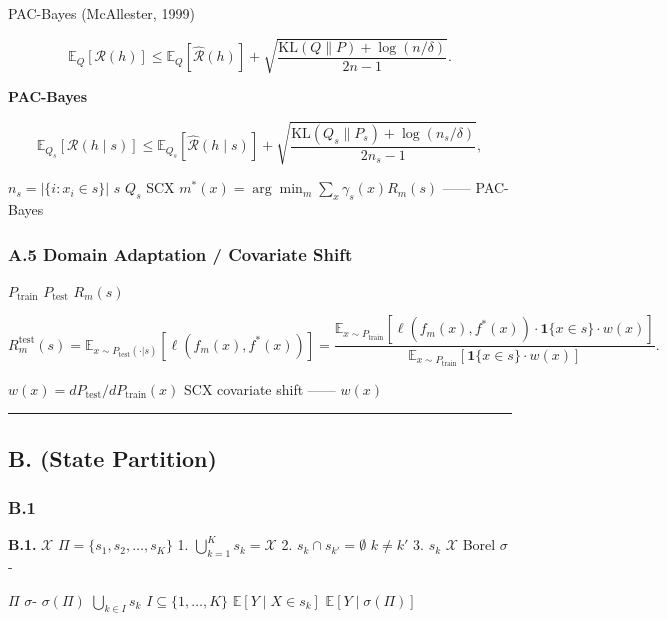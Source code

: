 \documentclass[
  12pt,
]{article}
\begin{document}
PAC-Bayes  (McAllester, 1999)


\[\mathbb{E}_{Q}[\mathcal{R}(h)] \leq \mathbb{E}_{Q}[\hat{\mathcal{R}}(h)] + \sqrt{\frac{\text{KL}(Q \| P) + \log(n/\delta)}{2n-1}}.\]

\textbf{ PAC-Bayes}

\[\mathbb{E}_{Q_s}[\mathcal{R}(h \mid s)] \leq \mathbb{E}_{Q_s}[\hat{\mathcal{R}}(h \mid s)] + \sqrt{\frac{\text{KL}(Q_s \| P_s) + \log(n_s/\delta)}{2n_s - 1}},\]

 \(n_s = |\{i: x_i \in s\}|\)  \(s\) \(Q_s\)
SCX 
\(m^*(x) = \arg\min_m \sum_x \gamma_s(x) R_m(s)\)
------ PAC-Bayes


\subsubsection{A.5  Domain Adaptation / Covariate Shift
}\label{a.5-ux4e0e-domain-adaptation-covariate-shift-ux7684ux5173ux7cfb}

 \(P_{\text{train}}\) 
\(P_{\text{test}}\)  \(R_m(s)\) 

\[R_m^{\text{test}}(s) = \mathbb{E}_{x \sim P_{\text{test}}(\cdot|s)}[\ell(f_m(x), f^*(x))] = \frac{\mathbb{E}_{x \sim P_{\text{train}}} [\ell(f_m(x), f^*(x)) \cdot \mathbf{1}\{x \in s\} \cdot w(x)]}{\mathbb{E}_{x \sim P_{\text{train}}} [\mathbf{1}\{x \in s\} \cdot w(x)]}.\]

 \(w(x) = dP_{\text{test}} / dP_{\text{train}}(x)\) 
SCX  \textbf{}  covariate shift
------ \(w(x)\) 

\begin{center}\rule{0.5\linewidth}{0.5pt}\end{center}

\subsection{B.  (State
Partition)}\label{b.-ux72b6ux6001ux5212ux5206-state-partition}

\subsubsection{B.1
}\label{b.1-ux6d4bux5ea6ux8bbaux7684ux53efux6d4bux5212ux5206}

\textbf{ B.1.}  \(\mathcal{X}\) 
\(\Pi = \{s_1, s_2, \dots, s_K\}\)  1.
\(\bigcup_{k=1}^K s_k = \mathcal{X}\) 2. \(s_k \cap s_{k'} = \emptyset\)
 \(k \neq k'\) 3.  \(s_k\)  \(\mathcal{X}\)  Borel
\(\sigma\)-

 \(\Pi\)  \(\sigma\)- \(\sigma(\Pi)\) 
\(\bigcup_{k \in I} s_k\)
\(I \subseteq \{1,\dots,K\}\)
\(\mathbb{E}[Y \mid X \in s_k]\)  \(\mathbb{E}[Y \mid \sigma(\Pi)]\)
\end{document}
